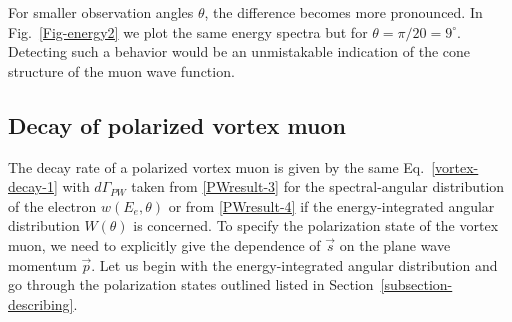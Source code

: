 \documentclass[aps,prd,longbibliography,nofootinbib,amsthm,amsmath,amssymb,amsfonts,notitlepage]{revtex4-1}
\begin{document}
For smaller observation angles $\theta$, the difference becomes more pronounced. In Fig.~\ref{Fig-energy2} we plot the same energy spectra
but for $\theta = \pi/20 = 9^\circ$. Detecting such a behavior would be an unmistakable indication of the cone structure of the muon wave function.

\subsection{Decay of polarized vortex muon}

The decay rate of a polarized vortex muon is given by the same Eq.~\eqref{vortex-decay-1} with
$d\Gamma_{PW}$ taken from \eqref{PWresult-3} for the spectral-angular distribution of the electron $w(E_e,\theta)$
or from \eqref{PWresult-4} if the energy-integrated angular distribution $W(\theta)$ is concerned.
To specify the polarization state of the vortex muon, we need to
explicitly give the dependence of $\vec s$ on the plane wave momentum $\vec p$.
Let us begin with the energy-integrated angular distribution
and go through the polarization states outlined listed in Section~\ref{subsection-describing}.
\end{document}
